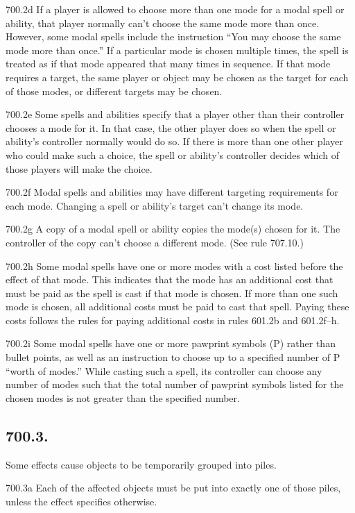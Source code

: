 700.2d If a player is allowed to choose more than one mode for a modal spell or ability, that player normally can’t choose the same mode more than once. However, some modal spells include the instruction “You may choose the same mode more than once.” If a particular mode is chosen multiple times, the spell is treated as if that mode appeared that many times in sequence. If that mode requires a target, the same player or object may be chosen as the target for each of those modes, or different targets may be chosen.

700.2e Some spells and abilities specify that a player other than their controller chooses a mode for it. In that case, the other player does so when the spell or ability’s controller normally would do so. If there is more than one other player who could make such a choice, the spell or ability’s controller decides which of those players will make the choice.

700.2f Modal spells and abilities may have different targeting requirements for each mode. Changing a spell or ability’s target can’t change its mode.

700.2g A copy of a modal spell or ability copies the mode(s) chosen for it. The controller of the copy can’t choose a different mode. (See rule 707.10.)

700.2h Some modal spells have one or more modes with a cost listed before the effect of that mode. This indicates that the mode has an additional cost that must be paid as the spell is cast if that mode is chosen. If more than one such mode is chosen, all additional costs must be paid to cast that spell. Paying these costs follows the rules for paying additional costs in rules 601.2b and 601.2f–h.

700.2i Some modal spells have one or more pawprint symbols ({P}) rather than bullet points, as well as an instruction to choose up to a specified number of {P} “worth of modes.” While casting such a spell, its controller can choose any number of modes such that the total number of pawprint symbols listed for the chosen modes is not greater than the specified number.

\subsection*{700.3.}
Some effects cause objects to be temporarily grouped into piles.

700.3a Each of the affected objects must be put into exactly one of those piles, unless the effect specifies otherwise.

